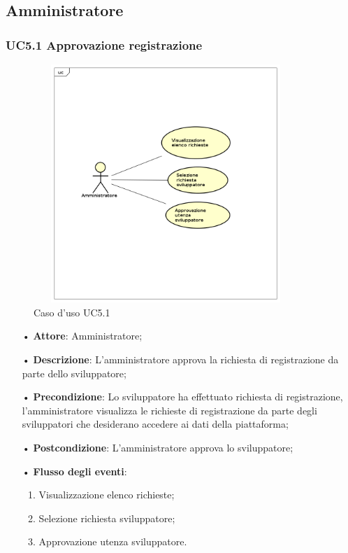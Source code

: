 \subsection{Amministratore}
\subsubsection{UC5.1 Approvazione registrazione}

\begin{figure}[H]
\centering
\includegraphics[width=10cm,height=9cm]{img/UC51.png} 
\caption{Caso d'uso UC5.1}
\end{figure}

\begin{itemize}
\item[•] \textbf{Attore}: Amministratore;

\item[•] \textbf{Descrizione}: L’amministratore approva la richiesta di registrazione da parte dello sviluppatore;

\item[•] \textbf{Precondizione}: Lo sviluppatore ha effettuato richiesta di registrazione, l'amministratore visualizza le richieste di registrazione da parte degli sviluppatori che desiderano accedere ai dati della piattaforma;

\item[•] \textbf{Postcondizione}: L’amministratore approva lo sviluppatore;

\item[•] \textbf{Flusso degli eventi}:

\begin{enumerate}

\item Visualizzazione elenco richieste;

\item Selezione richiesta sviluppatore;

\item Approvazione utenza sviluppatore.

\end{enumerate}

\end{itemize}


